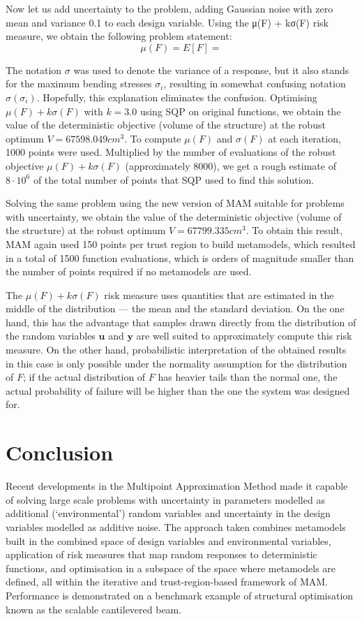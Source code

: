 \documentclass[10pt,twocolumn,a4paper]{article}
\begin{document}
Now let us add uncertainty to the problem, adding Gaussian noise with zero mean and variance 0.1 to each design variable. Using the μ(F) + kσ(F) risk measure, we obtain the following problem statement:
\begin{displaymath}
  \mu (F)=E[F]=
\end{displaymath}

The notation $\sigma$ was used to denote the variance of a response, but it also stands for the maximum bending stresses $\sigma_i$, resulting in somewhat confusing notation $\sigma(\sigma_i )$. Hopefully, this explanation eliminates the confusion. Optimising $\mu(F) + k\sigma(F)$ with $k = 3.0$ using SQP on original functions, we obtain the value of the deterministic objective (volume of the structure) at the robust optimum $V = 67598.049 cm^3$. To compute $\mu(F)$ and $\sigma(F)$ at each iteration, 1000 points were used. Multiplied by the number of evaluations of the robust objective $\mu(F) + k\sigma(F)$ (approximately 8000), we get a rough estimate of $8\cdot 10^6$ of the total number of points that SQP used to find this solution.

Solving the same problem using the new version of MAM suitable for problems with uncertainty, we obtain the value of the deterministic objective (volume of the structure) at the robust optimum $V = 67799.335 cm^3$. To obtain this result, MAM again used 150 points per trust region to build metamodels, which resulted in a total of 1500 function evaluations, which is orders of magnitude smaller than the number of points required if no metamodels are used.

The $\mu(F ) + k\sigma(F)$ risk measure uses quantities that are estimated in the middle of the distribution --- the mean and the standard deviation. On the one hand, this has the advantage that samples drawn directly from the distribution of the random variables $\pmb u$ and $\pmb y$ are well suited to approximately compute this risk measure. On the other hand, probabilistic interpretation of the obtained results in this case is only possible under the normality assumption for the distribution of $F$; if the actual distribution of $F$ has heavier tails than the normal one, the actual probability of failure will be higher than the one  the system was designed for.

\section{Conclusion}

Recent developments in the Multipoint Approximation Method made it capable of solving large scale problems with uncertainty in parameters modelled as additional (‘environmental’) random variables and uncertainty in the design variables modelled as additive noise. The approach taken combines metamodels built in the combined space of design variables and environmental variables, application of risk measures that map random responses to deterministic functions, and optimisation in a subspace of the space where metamodels are defined, all within the iterative and trust-region-based framework of MAM. Performance is demonstrated on a benchmark example of structural optimisation known as the scalable cantilevered beam.
\end{document}

